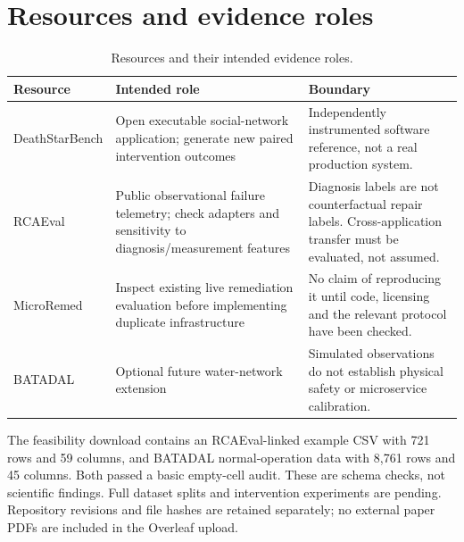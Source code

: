 ﻿\documentclass[sigconf,nonacm]{acmart}
\begin{document}
\begin{figure}[t]
\label{fig:framework}
\end{figure}

\section{Resources and evidence roles}
\begin{table}[t]
\caption{Resources and their intended evidence roles.}
\label{tab:resources}
\small
\begin{tabular}{>{\raggedright\arraybackslash}p{}>{\raggedright\arraybackslash}p{}>{\raggedright\arraybackslash}p{}}
\toprule Resource & Intended role & Boundary \\
\midrule
DeathStarBench \cite{dsb} & Open executable social-network application; generate new paired intervention outcomes & Independently instrumented software reference, not a real production system. \\
RCAEval \cite{rca} & Public observational failure telemetry; check adapters and sensitivity to diagnosis/measurement features & Diagnosis labels are not counterfactual repair labels. Cross-application transfer must be evaluated, not assumed. \\
MicroRemed \cite{micro} & Inspect existing live remediation evaluation before implementing duplicate infrastructure & No claim of reproducing it until code, licensing and the relevant protocol have been checked. \\
BATADAL \cite{batadal} & Optional future water-network extension & Simulated observations do not establish physical safety or microservice calibration. \\
\bottomrule
\end{tabular}
\end{table}

The feasibility download contains an RCAEval-linked example CSV with 721 rows and 59 columns, and BATADAL normal-operation data with 8,761 rows and 45 columns. Both passed a basic empty-cell audit. These are schema checks, not scientific findings. Full dataset splits and intervention experiments are pending. Repository revisions and file hashes are retained separately; no external paper PDFs are included in the Overleaf upload.
\end{document}
